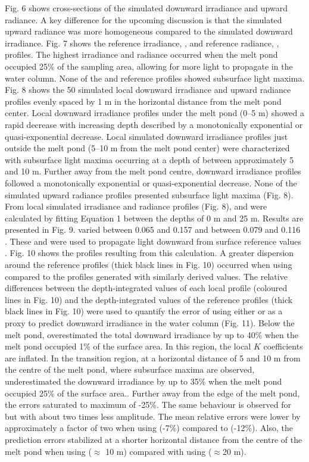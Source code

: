 Fig. 6 shows cross-sections of the simulated downward irradiance and upward radiance. A key difference for the upcoming discussion is that the simulated upward radiance was more homogeneous compared to the simulated downward irradiance. Fig. 7 shows the reference irradiance, \edz{}, and reference radiance, \luz{}, profiles. The highest irradiance and radiance occurred when the melt pond occupied 25\% of the sampling area, allowing for more light to propagate in the water column. None of the \edz{} and \luz{} reference profiles showed subsurface light maxima. Fig. 8 shows the 50 simulated local downward irradiance and upward radiance profiles evenly spaced by 1 m in the horizontal distance from the melt pond center. Local downward irradiance profiles under the melt pond (0--5 m) showed a rapid decrease with increasing depth described by a monotonically exponential or quasi-exponential decrease. Local simulated downward irradiance profiles just outside the melt pond (5--10 m from the melt pond center) were characterized with subsurface light maxima occurring at a depth of between approximately 5 and 10 m. Further away from the melt pond centre, downward irradiance profiles followed a monotonically exponential or quasi-exponential decrease. None of the simulated upward radiance profiles presented subsurface light maxima (Fig. 8). From local simulated irradiance and radiance profiles (Fig. 8), \ked{} and \klu{} were calculated by fitting Equation 1 between the depths of 0 m and 25 m. Results are presented in Fig. 9. \ked{} varied between 0.065 and 0.157 \mminus{} and \klu{} between 0.079 and 0.116 \mminus{}. These \ked{} and \klu{} were used to propagate light downward from surface reference values \edzero{}. Fig. 10 shows the profiles resulting from this calculation. A greater dispersion around the reference profiles (thick black lines in Fig. 10) occurred when using \ked{} compared to the profiles generated with similarly derived \klu{} values. The relative differences between the depth-integrated values of each local profile (coloured lines in Fig. 10) and the depth-integrated values of the reference profiles (thick black lines in Fig. 10) were used to quantify the error of using either \ked{} or \klu{} as a proxy to predict downward irradiance in the water column (Fig. 11). Below the melt pond, \ked{} overestimated the total downward irradiance by up to 40\% when the melt pond occupied 1\% of the surface area. In this region, the local $K$ coefficients are inflated. In the transition region, at a horizontal distance of 5 and 10 m from the centre of the melt pond, where subsurface maxima are observed, \ked{} underestimated the downward irradiance by up to 35\% when the melt pond occupied 25\% of the surface area.. Further away from the edge of the melt pond, the errors saturated to maximum of -25\%. The same behaviour is observed for \klu{} but with about two times less amplitude. The mean relative errors were lower by approximately a factor of two when using \klu{} (-7\%) compared to \ked{} (-12\%). Also, the prediction errors stabilized at a shorter horizontal distance from the centre of the melt pond when using \klu{} ($\approx$ 10 m) compared with using \ked{} ($\approx$20 m). 


